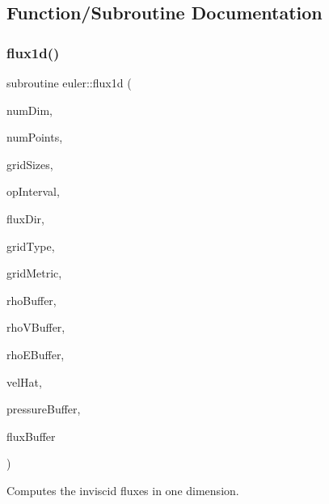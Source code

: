 \subsection{Function/\+Subroutine Documentation}
\hypertarget{namespaceeuler_a75d1a7e992d0b046ee381c90d22d4c44}{}\label{namespaceeuler_a75d1a7e992d0b046ee381c90d22d4c44} 
\subsubsection{\texorpdfstring{flux1d()}{flux1d()}}
{\footnotesize\ttfamily subroutine euler\+::flux1d (\begin{DoxyParamCaption}\item[{integer(kind=4), intent(in)}]{num\+Dim,  }\item[{integer(kind=8), intent(in)}]{num\+Points,  }\item[{integer(kind=8), dimension(numdim), intent(in)}]{grid\+Sizes,  }\item[{integer(kind=8), dimension(2$\ast$numdim), intent(in)}]{op\+Interval,  }\item[{integer(kind=4), intent(in)}]{flux\+Dir,  }\item[{integer(kind=4), intent(in)}]{grid\+Type,  }\item[{real(kind=8), dimension(numdim$\ast$numdim$\ast$numpoints), intent(in), target}]{grid\+Metric,  }\item[{real(kind=8), dimension(numpoints), intent(in)}]{rho\+Buffer,  }\item[{real(kind=8), dimension(numdim$\ast$numpoints), intent(in), target}]{rho\+V\+Buffer,  }\item[{real(kind=8), dimension(numpoints), intent(in)}]{rho\+E\+Buffer,  }\item[{real(kind=8), dimension(numpoints), intent(in)}]{vel\+Hat,  }\item[{real(kind=8), dimension(numpoints), intent(in)}]{pressure\+Buffer,  }\item[{real(kind=8), dimension(numpoints$\ast$(numdim+2)), intent(out), target}]{flux\+Buffer }\end{DoxyParamCaption})}



Computes the inviscid fluxes in one dimension. 

